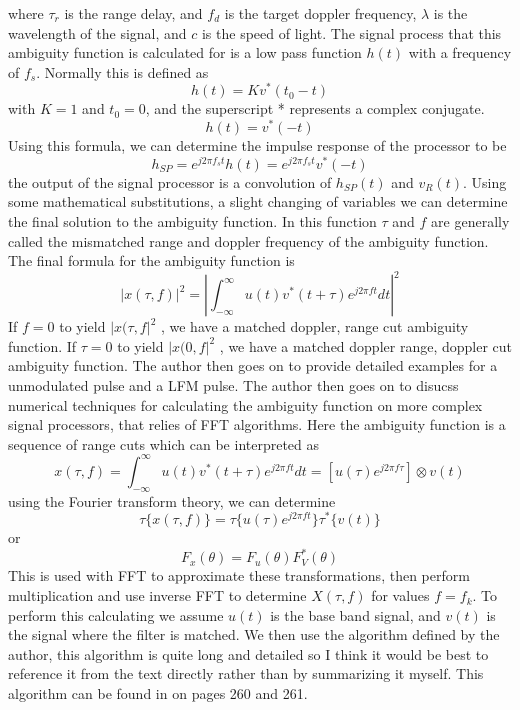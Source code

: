 \documentclass[12pt]{article}
\begin{document}
where $\tau_r$ is the range delay, and $f_d$ is the target doppler frequency, $\lambda$ is the wavelength of the signal, and $c$ is the speed of light. The signal process that this ambiguity function is calculated for is a low pass function $h(t)$ with a frequency of $f_s$. Normally this is defined as 
\begin{equation}
    h(t) = Kv^* (t_0 -t)
\end{equation}
with $K=1$ and $t_0 = 0$, and the superscript * represents a complex conjugate. 
\begin{equation}
    h(t) = v^* (-t)
\end{equation} 
Using this formula, we can determine the impulse response of the processor to be
\begin{equation}
    h_{SP} = e^{j2 \pi f_s t} h(t) = e^{j2 \pi f_s t} v^* (-t)
\end{equation}
the output of the signal processor is a convolution of $h_{SP}(t)$ and $v_R(t)$. Using some mathematical substitutions, a slight changing of variables we can determine the final solution to the ambiguity function. In this function $\tau$ and $f$ are generally called the mismatched range and doppler frequency of the ambiguity function. The final formula for the ambiguity function is 
\begin{equation}
    | x(\tau, f)|^2 = | \int_{-\infty}^{\infty} u(t) v^* (t+\tau) e^{j2 \pi ft} dt | ^2
\end{equation}
If $f=0$ to yield $|x(\tau, f|^2$ , we have a matched doppler, range cut ambiguity function. If $\tau=0$ to yield $|x(0, f|^2$ , we have a matched doppler range, doppler cut ambiguity function. The author then goes on to provide detailed examples for a unmodulated pulse and a LFM pulse. The author then goes on to disucss numerical techniques for calculating the ambiguity function on more complex signal processors, that relies of FFT algorithms. Here the ambiguity function is a sequence of range cuts which can be interpreted as 
\begin{equation}
    x(\tau, f) = \int_{-\infty}^{\infty} u(t)v^*(t+\tau)e^{j2 \pi ft} dt = [u(\tau)e^{j2 \pi f \tau}] \otimes v(t)
\end{equation}
using the Fourier transform theory, we can determine 
\begin{equation}
    \tau \{ x(\tau, f) \} = \tau \{ u(\tau) e^{j2\pi ft} \} \tau^* \{v(t)\}
\end{equation}
or
\begin{equation}
    F_x (\theta) = F_u (\theta) F_V^* (\theta)
\end{equation}
This is used with FFT to approximate these transformations, then perform multiplication and use inverse FFT to determine $X(\tau, f)$ for values $f=f_k$. To perform this calculating we assume $u(t)$ is the base band signal, and $v(t)$ is the signal where the filter is matched. We then use the algorithm defined by the author, this algorithm is quite long and detailed so I think it would be best to reference it from the text directly rather than by summarizing it myself. This algorithm can be found in \cite{BRA} on pages 260 and 261.
\end{document}
